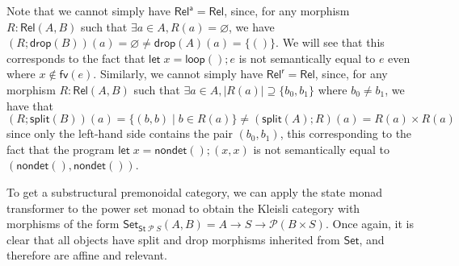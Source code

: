 \documentclass[acmsmall,screen,review]{acmart}
\newcommand{\mc}[1]{\ensuremath{\mathcal{#1}}}
\newcommand{\ms}[1]{\ensuremath{\mathsf{#1}}}
\begin{document}
Note that we cannot simply have \(\ms{Rel}^{\ms{a}} = \ms{Rel}\), since, for any
morphism \(R: \ms{Rel}(A, B)\) such that \(\exists a \in A, R(a) =
\varnothing\), we have \( (R;\ms{drop}(B))(a) = \varnothing \neq \ms{drop}(A)(a)
= \{()\} \). We will see that this corresponds to the fact that \( \ms{let}\;x =
\ms{loop}(); e \) is not semantically equal to \(e\) even where \(x \notin
\ms{fv}(e)\). Similarly, we cannot simply have \(\ms{Rel}^{\ms{r}} = \ms{Rel}\),
since, for any morphism \(R: \ms{Rel}(A, B)\) such that \(\exists a \in A,
|R(a)| \supseteq \{b_0, b_1\}\) where \(b_0 \neq b_1\), we have that
\begin{equation}
  (R;\ms{split}(B))(a) = \{(b, b) \mid b \in R(a)\} \neq (\ms{split}(A);R)(a) = R(a) \times R(a) 
\end{equation}
since only the left-hand side contains the pair \((b_0, b_1)\), this
corresponding to the fact that the program \(\ms{let}\;x = \ms{nondet}(); (x, x)\) is
not semantically equal to \((\ms{nondet}(), \ms{nondet}())\).

To get a substructural premonoidal category, we can apply the state monad
transformer to the power set monad to obtain the Kleisli category with morphisms
of the form \(\ms{Set}_{\ms{St}\;\mc{P}\;S}(A, B) = A \to S \to \mc{P}(B \times
S)\). Once again, it is clear that all objects have split and drop morphisms
inherited from \(\ms{Set}\), and therefore are affine and relevant.
\end{document}
